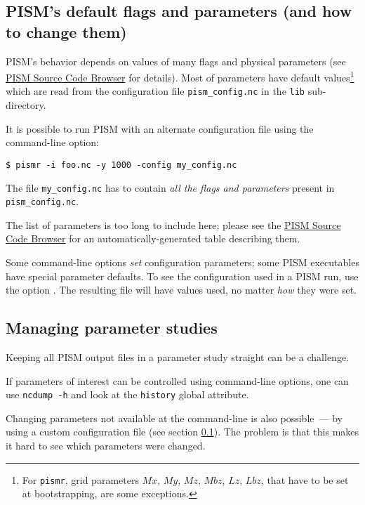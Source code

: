 \subsection{PISM's default flags and parameters (and how to change them)}
\label{sec:pism-defaults}

PISM's behavior depends on values of many flags and physical parameters (see
\href{http://www.pism-docs.org/doxy/html/index.html}{PISM Source Code Browser} for details). Most of parameters have default values\footnote{For \texttt{pismr}, grid parameters $Mx$, $My$, $Mz$, $Mbz$, $Lz$, $Lbz$, that have to be set at bootstrapping, are some exceptions.} which are read from the configuration file \texttt{pism_config.nc} in the \texttt{lib} sub-directory.

It is possible to run PISM with an alternate configuration file using the  command-line option:
\begin{verbatim}
$ pismr -i foo.nc -y 1000 -config my_config.nc
\end{verbatim}

The file \texttt{my_config.nc} has to contain \emph{all the flags and parameters} present in \texttt{pism_config.nc}.

The list of parameters is too long to include here; please see the \href{http://www.pism-docs.org/doxy/html/index.html}{PISM Source Code Browser} for an automatically-generated table describing them.

Some command-line options \emph{set} configuration parameters; some PISM
executables have special parameter defaults. To see the configuration used in a
PISM run, use the option . The resulting file will have values
used, no matter \emph{how} they were set.

\subsection{Managing parameter studies}
\label{sec:parameter-studies}
Keeping all PISM output files in a parameter study straight can be a challenge.

If parameters of interest can be controlled using command-line options, one can use \texttt{ncdump -h} and look at the \texttt{history} global attribute.

Changing parameters not available at the command-line is also possible~--- by using a custom configuration file (see section \ref{sec:pism-defaults}). The problem is that this makes it hard to see which parameters were changed.

